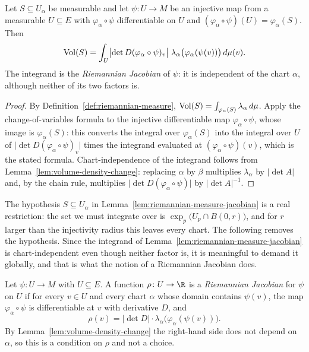 \begin{lemma}
\label{lem:riemannian-measure-jacobian}





Let $S\subseteq U_\alpha$ be measurable and let $\psi\colon U\to M$ be an injective map from a
measurable $U\subseteq E$ with $\varphi_\alpha\circ\psi$ differentiable on $U$ and
$(\varphi_\alpha\circ\psi)(U)=\varphi_\alpha(S)$. Then
$$\operatorname{Vol}(S)=\int_U \bigl\lvert\det D(\varphi_\alpha\circ\psi)_v\bigr\rvert\;
\lambda_\alpha\bigl(\varphi_\alpha(\psi(v))\bigr)\,d\mu(v).$$
The integrand is the \emph{Riemannian Jacobian} of $\psi$: it is independent of the chart
$\alpha$, although neither of its two factors is.
\end{lemma}

\begin{proof}
\sketch
{}

By Definition~\ref{def:riemannian-measure},
$\operatorname{Vol}(S)=\int_{\varphi_\alpha(S)}\lambda_\alpha\,d\mu$. Apply the change-of-variables formula
to the injective differentiable map $\varphi_\alpha\circ\psi$, whose image is
$\varphi_\alpha(S)$: this converts the integral over $\varphi_\alpha(S)$ into the integral
over $U$ of $\lvert\det D(\varphi_\alpha\circ\psi)_v\rvert$ times the integrand evaluated at
$(\varphi_\alpha\circ\psi)(v)$, which is the stated formula. Chart-independence of the
integrand follows from Lemma~\ref{lem:volume-density-change}: replacing $\alpha$ by $\beta$
multiplies $\lambda_\alpha$ by $\lvert\det A\rvert$ and, by the chain rule, multiplies
$\lvert\det D(\varphi_\alpha\circ\psi)\rvert$ by $\lvert\det A\rvert^{-1}$.
\end{proof}

The hypothesis $S\subseteq U_\alpha$ in
Lemma~\ref{lem:riemannian-measure-jacobian} is a real restriction: the
set we must integrate over is $\exp_p\bigl(U_p\cap B(0,r)\bigr)$, and
for $r$ larger than the injectivity radius this leaves every chart. The
following removes the hypothesis. Since the integrand of
Lemma~\ref{lem:riemannian-measure-jacobian} is chart-independent even
though neither factor is, it is meaningful to demand it globally, and
that is what the notion of a Riemannian Jacobian does.

\begin{definition}
\label{def:riemannian-jacobian}





Let $\psi\colon U\to M$ with $U\subseteq E$. A function $\rho\colon
U\to\R$ is a \emph{Riemannian Jacobian} for $\psi$ on $U$ if for every
$v\in U$ and every chart $\alpha$ whose domain contains $\psi(v)$, the
map $\varphi_\alpha\circ\psi$ is differentiable at $v$ with derivative
$D$, and
$$\rho(v)=\lvert\det D\rvert\cdot
\lambda_\alpha\bigl(\varphi_\alpha(\psi(v))\bigr).$$
By Lemma~\ref{lem:volume-density-change} the right-hand side does not
depend on $\alpha$, so this is a condition on $\rho$ and not a choice.
\end{definition}

